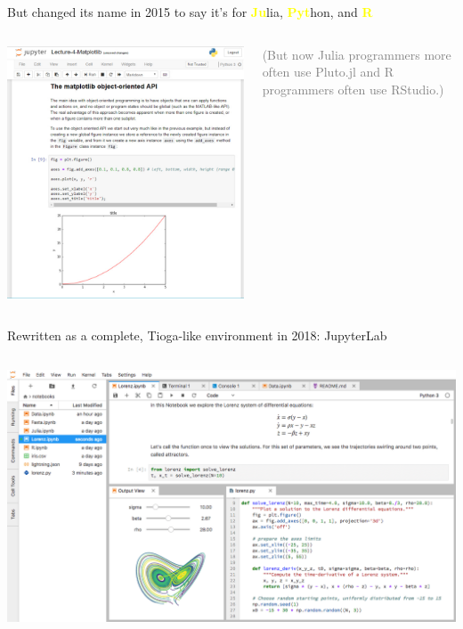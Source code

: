 \documentclass[aspectratio=169]{beamer}
\begin{document}
\begin{frame}{But changed its name in 2015 to say it's for \textcolor{yellow}{\bf Ju}lia, \textcolor{yellow}{\bf Pyt}hon, and \textcolor{yellow}{\bf R}}
\vspace{0.2 cm}
\begin{columns}
\includegraphics[width=\linewidth]{img/screenshot-2015-jupyter-notebook.png}

\Large
\textcolor{gray}{(But now Julia programmers more often use Pluto.jl and R programmers often use RStudio.)}
\end{columns}
\end{frame}

\begin{frame}{Rewritten as a complete, Tioga-like environment in 2018: JupyterLab}
\vspace{0.2 cm}
\begin{columns}
\includegraphics[width=\linewidth]{img/screenshot-2018-jupyterlab.png}
\end{columns}
\end{frame}
\end{document}
